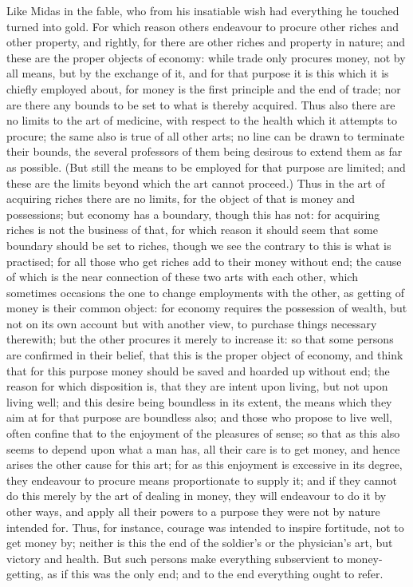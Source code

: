 Like Midas in the fable, who from his insatiable wish had everything he
touched turned into gold. For which reason others endeavour to procure
other riches and other property, and rightly, for there are other riches
and property in nature; and these are the proper objects of economy: while
trade only procures money, not by all means, but by the exchange of it,
and for that purpose it is this which it is chiefly employed about, for
money is the first principle and the end of trade; nor are there any
bounds to be set to what is thereby acquired. Thus also there are no
limits to the art of medicine, with respect to the health which it
attempts to procure; the same also is true of all other arts; no line can
be drawn to terminate their bounds, the several professors of them being
desirous to extend them as far as possible. (But still the means to be
employed for that purpose are limited; and these are the limits beyond
which the art cannot proceed.) Thus in the art of acquiring riches there
are no limits, for the object of that is money and possessions; but
economy has a boundary, though this has not: for acquiring riches is not
the business of that, for which reason it should seem that some boundary
should be set to riches, though we see the contrary to this is what is
practised; for all those who get riches add to their money without end;
the cause of which is the near connection of these two arts with each
other, which sometimes occasions the one to change employments with the
other, as getting of money is their common object: for economy requires
the possession of wealth, but not on its own account but with another
view, to purchase things necessary therewith; but the other procures it
merely to increase it: so that some persons are confirmed in their belief,
that this is the proper object of economy, and think that for this purpose
money should be saved and hoarded up without end; the reason for which
disposition is, that they are intent upon living, but not upon living
well; and this desire being boundless in its extent, the means which they
aim at for that purpose are boundless also; and those who propose to live
well, often confine that to the enjoyment of the pleasures of sense; so
that as this also seems to depend upon what a man has, all their care is
to get money, and hence arises the other cause for this art; for as this
enjoyment is excessive in its degree, they endeavour to procure means
proportionate to supply it; and if they cannot do this merely by the art
of dealing in money, they will endeavour to do it by other ways, and apply
all their powers to a purpose they were not by nature intended for. Thus,
for instance, courage was intended to inspire fortitude, not to get money
by; neither is this the end of the soldier's or the physician's art, but
victory and health. But such persons make everything subservient to
money-getting, as if this was the only end; and to the end everything
ought to refer.

